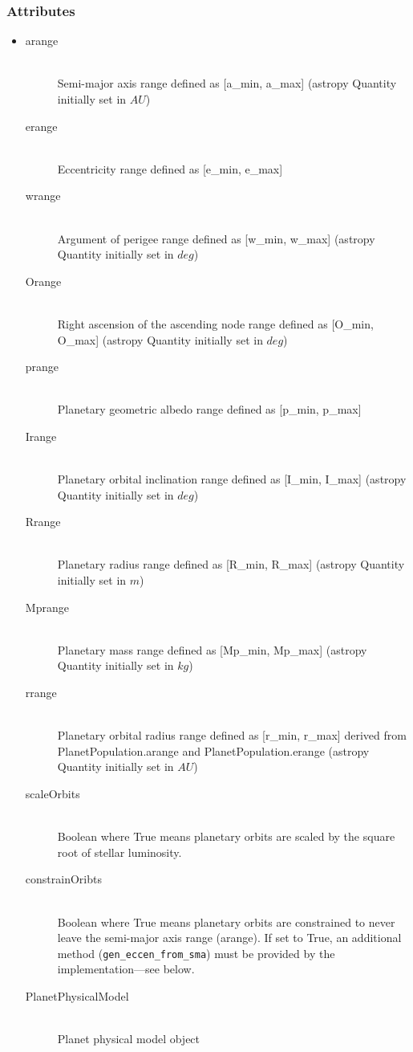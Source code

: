 \documentclass[cleanfoot]{asme2ej}
\begin{document}
\subsubsection*{Attributes}
\begin{itemize}
    \item
    \begin{description}
        \item[arange] \hfill \\
        Semi-major axis range defined as [a\_min, a\_max] (astropy Quantity initially set in $ AU $)
        \item[erange] \hfill \\
        Eccentricity range defined as [e\_min, e\_max]
        \item[wrange] \hfill \\
        Argument of perigee range defined as [w\_min, w\_max] (astropy Quantity initially set in $ deg $)
        \item[Orange] \hfill \\
        Right ascension of the ascending node range defined as [O\_min, O\_max]  (astropy Quantity initially set in $ deg $)
        \item[prange] \hfill \\
        Planetary geometric albedo range defined as [p\_min, p\_max]
        \item[Irange] \hfill \\
        Planetary orbital inclination range defined as [I\_min, I\_max]  (astropy Quantity initially set in $ deg $)
        \item[Rrange] \hfill \\
        Planetary radius range defined as [R\_min, R\_max] (astropy Quantity initially set in $ m $)
        \item[Mprange] \hfill \\
        Planetary mass range defined as [Mp\_min, Mp\_max] (astropy Quantity initially set in $ kg $)
        \item[rrange] \hfill \\
        Planetary orbital radius range defined as [r\_min, r\_max] derived from PlanetPopulation.arange and PlanetPopulation.erange (astropy Quantity initially set in $ AU $)
     \item [scaleOrbits] \hfill \\
    Boolean where True means planetary orbits are scaled by the square root of stellar luminosity.
    \item[constrainOribts] \hfill \\
    Boolean where True means planetary orbits are constrained to never leave the semi-major axis range (arange). If set to True, an additional method (\verb+gen_eccen_from_sma+) must be provided by the implementation---see below.
         \item[PlanetPhysicalModel] \hfill \\     
            Planet physical model object
    \end{description}
\end{itemize}
\end{document}
